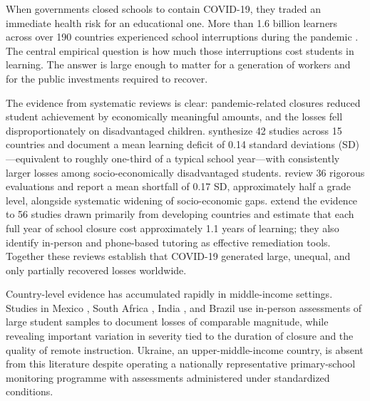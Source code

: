 
When governments closed schools to contain COVID-19, they traded an immediate health risk for an educational one. More than 1.6 billion learners across over 190 countries experienced school interruptions during the pandemic \citep{unesco2021year}. The central empirical question is how much those interruptions cost students in learning. The answer is large enough to matter for a generation of workers and for the public investments required to recover.

The evidence from systematic reviews is clear: pandemic-related closures reduced student achievement by economically meaningful amounts, and the losses fell disproportionately on disadvantaged children. \citet{betthauser2023systematic} synthesize 42 studies across 15 countries and document a mean learning deficit of 0.14 standard deviations (SD)---equivalent to roughly one-third of a typical school year---with consistently larger losses among socio-economically disadvantaged students. \citet{patrinos2022analysis} review 36 rigorous evaluations and report a mean shortfall of 0.17 SD, approximately half a grade level, alongside systematic widening of socio-economic gaps. \citet{delacruz2024learning} extend the evidence to 56 studies drawn primarily from developing countries and estimate that each full year of school closure cost approximately 1.1 years of learning; they also identify in-person and phone-based tutoring as effective remediation tools. Together these reviews establish that COVID-19 generated large, unequal, and only partially recovered losses worldwide.

Country-level evidence has accumulated rapidly in middle-income settings. Studies in Mexico \citep{hevia2022estimation, alasino2024learning}, South Africa \citep{ardington2021covid}, India \citep{guariso2023impact, singh2024covid}, and Brazil \citep{lichand2022impacts} use in-person assessments of large student samples to document losses of comparable magnitude, while revealing important variation in severity tied to the duration of closure and the quality of remote instruction. Ukraine, an upper-middle-income country, is absent from this literature despite operating a nationally representative primary-school monitoring programme with assessments administered under standardized conditions.

